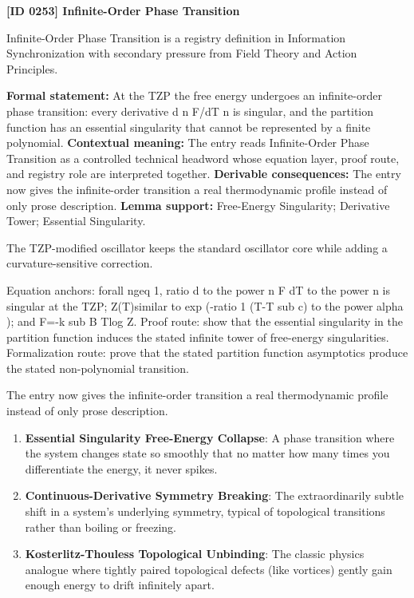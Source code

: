 \clearpage
\noindent\textbf{[ID 0253] Infinite-Order Phase Transition}\par
\vspace{0.35em}
\begingroup\small
{}
Infinite-Order Phase Transition is a registry definition in Information Synchronization with secondary pressure from Field Theory and Action Principles.

\begingroup\footnotesize\setlength{\emergencystretch}{3em}\sloppy
\textbf{Formal statement:} At the TZP the free energy undergoes an infinite-order phase transition: every derivative d n F/dT n is singular, and the partition function has an essential singularity that cannot be represented by a finite polynomial. \textbf{Contextual meaning:} The entry reads Infinite-Order Phase Transition as a controlled technical headword whose equation layer, proof route, and registry role are interpreted together. \textbf{Derivable consequences:} The entry now gives the infinite-order transition a real thermodynamic profile instead of only prose description. \textbf{Lemma support:} Free-Energy Singularity; Derivative Tower; Essential Singularity.\par
\endgroup

The TZP-modified oscillator keeps the standard oscillator core while adding a curvature-sensitive correction.

Equation anchors: forall ngeq 1, ratio d to the power n F dT to the power n is singular at the TZP; Z(T)similar to exp (-ratio 1 (T-T sub c) to the power alpha ); and F=-k sub B Tlog Z. Proof route: show that the essential singularity in the partition function induces the stated infinite tower of free-energy singularities. Formalization route: prove that the stated partition function asymptotics produce the stated non-polynomial transition.

The entry now gives the infinite-order transition a real thermodynamic profile instead of only prose description.
\endgroup

\begin{enumerate}[leftmargin=1.6em,itemsep=6pt,topsep=4pt]
\item \textbf{Essential Singularity Free-Energy Collapse}: A phase transition where the system changes state so smoothly that no matter how many times you differentiate the energy, it never spikes.
\item \textbf{Continuous-Derivative Symmetry Breaking}: The extraordinarily subtle shift in a system's underlying symmetry, typical of topological transitions rather than boiling or freezing.
\item \textbf{Kosterlitz-Thouless Topological Unbinding}: The classic physics analogue where tightly paired topological defects (like vortices) gently gain enough energy to drift infinitely apart.
\end{enumerate}

